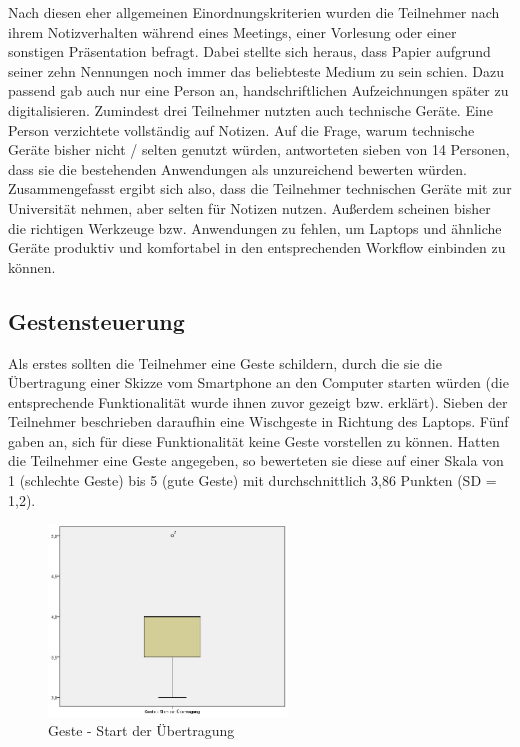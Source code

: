 \documentclass{chi-ext}
\begin{document}
Nach diesen eher allgemeinen Einordnungskriterien wurden die Teilnehmer nach ihrem Notizverhalten während eines Meetings, einer Vorlesung oder einer sonstigen Präsentation befragt.
Dabei stellte sich heraus, dass Papier aufgrund seiner zehn Nennungen noch immer das beliebteste Medium zu sein schien. Dazu passend gab auch nur eine Person an, handschriftlichen Aufzeichnungen später zu digitalisieren. Zumindest drei Teilnehmer nutzten auch technische Geräte. Eine Person verzichtete vollständig auf Notizen.
Auf die Frage, warum technische Geräte bisher nicht / selten genutzt würden, antworteten sieben von 14 Personen, dass sie die bestehenden Anwendungen als unzureichend bewerten würden.
Zusammengefasst ergibt sich also, dass die Teilnehmer technischen Geräte mit zur Universität nehmen, aber selten für Notizen nutzen. Außerdem scheinen bisher die richtigen Werkzeuge bzw. Anwendungen zu fehlen, um Laptops und ähnliche Geräte produktiv und komfortabel in den entsprechenden Workflow einbinden zu können.

\subsection{Gestensteuerung}

Als erstes sollten die Teilnehmer eine Geste schildern, durch die sie die Übertragung einer Skizze vom Smartphone an den Computer starten würden (die entsprechende Funktionalität wurde ihnen zuvor gezeigt bzw. erklärt). Sieben der Teilnehmer beschrieben daraufhin eine Wischgeste in Richtung des Laptops. Fünf gaben an, sich für diese Funktionalität keine Geste vorstellen zu können. Hatten die Teilnehmer eine Geste angegeben, so bewerteten sie diese auf einer Skala von 1 (schlechte Geste) bis 5 (gute Geste) mit durchschnittlich 3,86 Punkten (SD = 1,2).

\begin{figure}
  \centering
  \includegraphics[width=180pt]{img/studie/Geste_Start_Uebertragung.jpg}
  \caption{Geste - Start der Übertragung}
  \label{fig:studie_Geste_Start_Uebertragung}
\end{figure}
\end{document}
